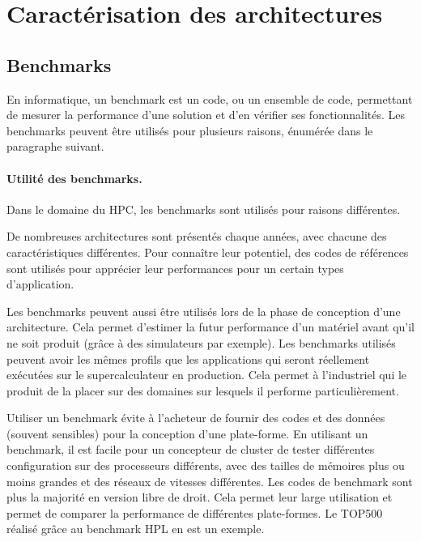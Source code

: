 \section{Caractérisation des architectures}\label{sec:caracterisation}






\subsection{Benchmarks}

En informatique, un benchmark est un code, ou un ensemble de code, permettant de mesurer la performance d'une solution et d'en vérifier ses fonctionnalités. Les benchmarks peuvent être utilisés pour plusieurs raisons, énumérée dans le paragraphe suivant. 

\paragraph{Utilité des benchmarks.}
Dans le domaine du HPC, les benchmarks sont utilisés pour raisons différentes. 
    
    De nombreuses architectures sont présentés chaque années, avec chacune des caractéristiques différentes. Pour connaître leur potentiel, des codes de références sont utilisés pour apprécier leur performances pour un certain types d'application. 
    
    Les benchmarks peuvent aussi être utilisés lors de la phase de conception d'une architecture. Cela permet d'estimer la futur performance d'un matériel avant qu'il ne soit produit (grâce à des simulateurs par exemple). Les benchmarks utilisés peuvent avoir les mêmes profils que les applications qui seront réellement exécutées sur le supercalculateur en production. Cela permet à l'industriel qui le produit de la placer sur des domaines sur lesquels il performe particulièrement.
     
    
    Utiliser un benchmark évite à l'acheteur de fournir des codes et des données (souvent sensibles) pour la conception d'une plate-forme. En utilisant un benchmark, il est facile pour un concepteur de cluster de tester différentes configuration sur des processeurs différents, avec des tailles de mémoires plus ou moins grandes et des réseaux de vitesses différentes. 
    Les codes de benchmark sont plus la majorité en version libre de droit. Cela permet leur large utilisation et permet de comparer la performance de différentes plate-formes. Le TOP500 réalisé grâce au benchmark HPL en est un exemple.
     
